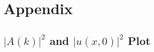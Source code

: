 \documentclass[11pt]{article}
\begin{document}
\clearpage

\section*{Appendix}

\subsection*{$|A(k)|^{2}$ and $|u(x, 0)|^{2}$ Plot}


\clearpage

\end{document}
